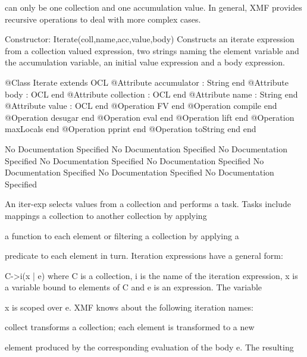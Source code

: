        can only be one collection and one accumulation value. In general,
       XMF provides recursive operations to deal with more complex cases.
     
       Constructor: Iterate(coll,name,acc,value,body)
         Constructs an iterate expression from a collection valued expression,
         two strings naming the element variable and the accumulation variable,
         an initial value expression and a body expression.
\begin{Interface}
@Class Iterate extends OCL
  @Attribute accumulator : String end
  @Attribute body : OCL end
  @Attribute collection : OCL end
  @Attribute name : String end
  @Attribute value : OCL end
  @Operation FV end
  @Operation compile end
  @Operation desugar end
  @Operation eval end
  @Operation lift end
  @Operation maxLocals end
  @Operation pprint end
  @Operation toString end
end
\end{Interface}
No Documentation Specified
No Documentation Specified
No Documentation Specified
No Documentation Specified
No Documentation Specified
No Documentation Specified
No Documentation Specified
No Documentation Specified

      An iter-exp selects values from a collection and performs a task.
      Tasks include mappings a collection to another collection by applying

      a function to each element or filtering a collection by applying a

      predicate to each element in turn.
      Iteration expressions have a general form:

        C->i(x | e)
      where C is a collection, i is the name of the iteration expression,
      x is a variable bound to elements of C and e is an expression. The variable

      x is scoped over e. XMF knows about the following iteration names:

        collect transforms a collection; each element is transformed to a new

          element produced by the corresponding evaluation of the body e. The resulting

